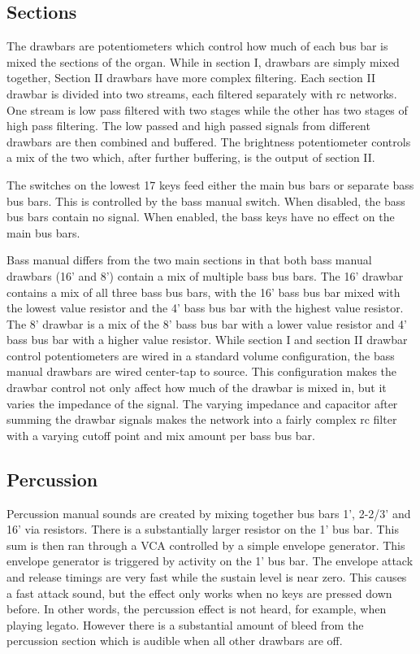 \documentclass[11pt,a4paper]{article}
\begin{document}
\subsection{Sections}
\label{section:sections}

The drawbars are potentiometers which control how much of each bus bar is mixed the sections of the organ. While in section I, drawbars are simply mixed together, Section II drawbars have more complex filtering. Each section II drawbar is divided into two streams, each filtered separately with rc networks. One stream is low pass filtered with two stages while the other has two stages of high pass filtering. The low passed and high passed signals from different drawbars are then combined and buffered. The brightness potentiometer controls a mix of the two which, after further buffering, is the output of section II. 

The switches on the lowest 17 keys feed either the main bus bars or separate bass bus bars. This is controlled by the bass manual switch. When disabled, the bass bus bars contain no signal. When enabled, the bass keys have no effect on the main bus bars.

Bass manual differs from the two main sections in that both bass manual drawbars (16' and 8') contain a mix of multiple bass bus bars. The 16' drawbar contains a mix of all three bass bus bars, with the 16' bass bus bar mixed with the lowest value resistor and the 4' bass bus bar with the highest value resistor. The 8' drawbar is a mix of the 8' bass bus bar with a lower value resistor and 4' bass bus bar with a higher value resistor. While section I and section II drawbar control potentiometers are wired in a standard volume configuration, the bass manual drawbars are wired center-tap to source. This configuration makes the drawbar control not only affect how much of the drawbar is mixed in, but it varies the impedance of the signal. The varying impedance and capacitor after summing the drawbar signals makes the network into a fairly complex rc filter with a varying cutoff point and mix amount per bass bus bar.

\subsection{Percussion}

Percussion manual sounds are created by mixing together bus bars 1', 2-2/3' and 16' via resistors. There is a substantially larger resistor on the 1' bus bar. This sum is then ran through a VCA controlled by a simple envelope generator. This envelope generator is triggered by activity on the 1' bus bar. The envelope attack and release timings are very fast while the sustain level is near zero. This causes a fast attack sound, but the effect only works when no keys are pressed down before. In other words, the percussion effect is not heard, for example, when playing legato. However there is a substantial amount of bleed from the percussion section which is audible when all other drawbars are off.
\end{document}
